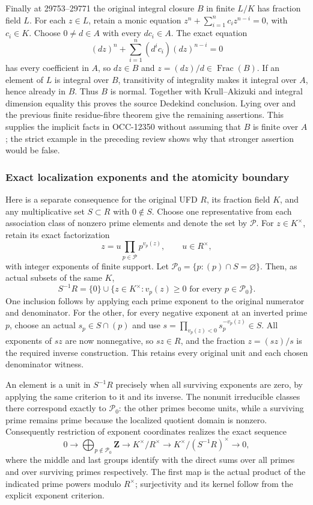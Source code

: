 Finally at 29753--29771 the original integral closure \(B\) in finite \(L/K\) has fraction field \(L\). For each \(z\in L\), retain a monic equation \(z^n+\sum_{i=1}^n c_i z^{n-i}=0\), with \(c_i\in K\). Choose \(0\ne d\in A\) with every \(dc_i\in A\). The exact equation \[
 (dz)^n+\sum_{i=1}^n(d^i c_i)(dz)^{n-i}=0
\] has every coefficient in \(A\), so \(dz\in B\) and \(z=(dz)/d\in\operatorname{Frac}(B)\). If an element of \(L\) is integral over \(B\), transitivity of integrality makes it integral over \(A\), hence already in \(B\). Thus \(B\) is normal. Together with Krull--Akizuki and integral dimension equality this proves the source Dedekind conclusion. Lying over and the previous finite residue-fibre theorem give the remaining assertions. This supplies the implicit facts in OCC-12350 without assuming that \(B\) is finite over \(A\); the strict example in the preceding review shows why that stronger assertion would be false.

\subsubsection{Exact localization exponents and the atomicity boundary}\label{exact-localization-exponents-and-the-atomicity-boundary}

Here is a separate consequence for the original UFD \(R\), its fraction field \(K\), and any multiplicative set \(S\subset R\) with \(0\notin S\). Choose one representative from each association class of nonzero prime elements and denote the set by \(\mathcal P\). For \(z\in K^\times\), retain its exact factorization \[
 z=u\prod_{p\in\mathcal P}p^{v_p(z)},\qquad u\in R^\times,
\] with integer exponents of finite support. Let \(\mathcal P_0=\{p:(p)\cap S=\varnothing\}\). Then, as actual subsets of the same \(K\), \[
 S^{-1}R=\{0\}\cup
 \{z\in K^\times:v_p(z)\ge0\text{ for every }p\in\mathcal P_0\}.
\] One inclusion follows by applying each prime exponent to the original numerator and denominator. For the other, for every negative exponent at an inverted prime \(p\), choose an actual \(s_p\in S\cap(p)\) and use \(s=\prod_{v_p(z)<0}s_p^{-v_p(z)}\in S\). All exponents of \(sz\) are now nonnegative, so \(sz\in R\), and the fraction \(z=(sz)/s\) is the required inverse construction. This retains every original unit and each chosen denominator witness.

An element is a unit in \(S^{-1}R\) precisely when all surviving exponents are zero, by applying the same criterion to it and its inverse. The nonunit irreducible classes there correspond exactly to \(\mathcal P_0\): the other primes become units, while a surviving prime remains prime because the localized quotient domain is nonzero. Consequently restriction of exponent coordinates realizes the exact sequence \[
 0\longrightarrow\bigoplus_{p\notin\mathcal P_0}\mathbf Z
 \longrightarrow K^\times/R^\times
 \longrightarrow K^\times/(S^{-1}R)^\times
 \longrightarrow0,
\] where the middle and last groups identify with the direct sums over all primes and over surviving primes respectively. The first map is the actual product of the indicated prime powers modulo \(R^\times\); surjectivity and its kernel follow from the explicit exponent criterion.

